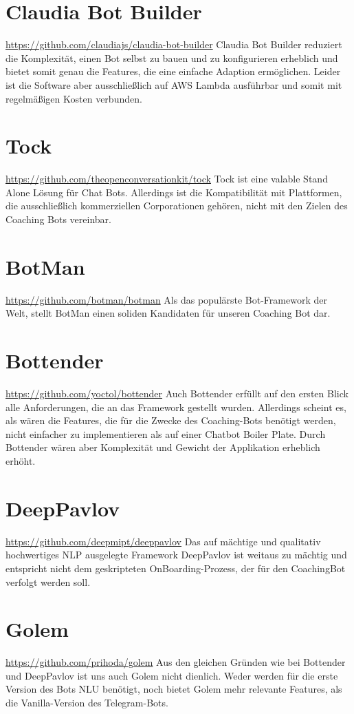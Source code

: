 \section{Claudia Bot Builder} \url{https://github.com/claudiajs/claudia-bot-builder}
Claudia Bot Builder reduziert die Komplexität, einen Bot selbst zu bauen und zu konfigurieren erheblich und bietet somit genau die Features, die eine einfache Adaption ermöglichen. Leider ist die Software aber ausschließlich auf AWS Lambda ausführbar und somit mit regelmäßigen Kosten verbunden. 

\section{Tock} \url{https://github.com/theopenconversationkit/tock}
Tock ist eine valable Stand Alone Lösung für Chat Bots. Allerdings ist die Kompatibilität mit Plattformen, die ausschließlich kommerziellen Corporationen gehören, nicht mit den Zielen des Coaching Bots vereinbar. 

\section{BotMan} \url{https://github.com/botman/botman}
Als das populärste Bot-Framework der Welt, stellt BotMan einen soliden Kandidaten für unseren Coaching Bot dar.

\section{Bottender} \url{https://github.com/yoctol/bottender}
Auch Bottender erfüllt auf den ersten Blick alle Anforderungen, die an das Framework gestellt wurden. Allerdings scheint es, als wären die Features, die für die Zwecke des Coaching-Bots benötigt werden, nicht einfacher zu implementieren als auf einer Chatbot Boiler Plate. Durch Bottender wären aber Komplexität und Gewicht der Applikation erheblich erhöht.

\section{DeepPavlov} \url{https://github.com/deepmipt/deeppavlov}
Das auf mächtige und qualitativ hochwertiges NLP ausgelegte Framework DeepPavlov ist weitaus zu mächtig und entspricht nicht dem geskripteten OnBoarding-Prozess, der für den CoachingBot verfolgt werden soll.

\section{Golem} \url{https://github.com/prihoda/golem}
Aus den gleichen Gründen wie bei Bottender und DeepPavlov ist uns auch Golem nicht dienlich. Weder werden für die erste Version des Bots NLU benötigt, noch bietet Golem mehr relevante Features, als die Vanilla-Version des Telegram-Bots.

